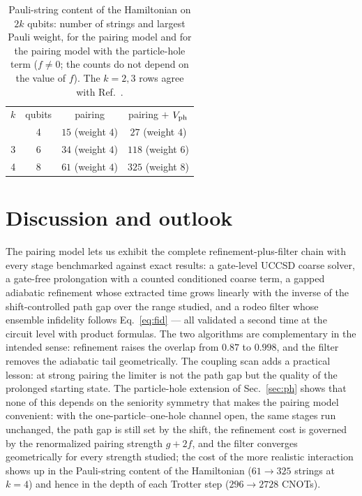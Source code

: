 \documentclass[
  aps,            %
  prc,            %
  reprint,        %
  superscriptaddress,
  floatfix,
  nofootinbib
]{revtex4-2}
\begin{document}
\begin{table}[t]
\caption{\label{tab:pauli}Pauli-string content of the Hamiltonian on $2k$
qubits: number of strings and largest Pauli weight, for the pairing model and
for the pairing model with the particle-hole term ($f\neq0$; the counts do not
depend on the value of $f$).  The $k=2,3$ rows agree with Ref.~\cite{MHJbook}.}
\footnotesize
\begin{ruledtabular}
\begin{tabular}{cccc}
$k$ & qubits & pairing & pairing $+$ $V_{\rm ph}$\\
\colrule
2 & 4 & $15$ (weight $4$) & $27$ (weight $4$)\\
3 & 6 & $34$ (weight $4$) & $118$ (weight $6$)\\
4 & 8 & $61$ (weight $4$) & $325$ (weight $8$)\\
\end{tabular}
\end{ruledtabular}
\end{table}

\section{Discussion and outlook}
\label{sec:discussion}
The pairing model lets us exhibit the complete refinement-plus-filter chain
with every stage benchmarked against exact results: a gate-level UCCSD coarse
solver, a gate-free prolongation with a counted conditioned coarse term, a
gapped adiabatic refinement whose extracted time grows linearly with the
inverse of the shift-controlled path gap over the range studied, and a rodeo
filter whose ensemble infidelity follows Eq.~\eqref{eq:fid} --- all validated
a second time at the circuit level with product formulas.  The two algorithms
are complementary in the intended sense: refinement raises the overlap from
$0.87$ to $0.998$, and the filter removes the adiabatic tail geometrically.
The coupling scan adds a practical lesson: at strong pairing the limiter is
not the path gap but the quality of the prolonged starting state.  The
particle-hole extension of Sec.~\ref{sec:ph} shows that none of this depends
on the seniority symmetry that makes the pairing model convenient: with the
one-particle--one-hole channel open, the same stages run unchanged, the path
gap is still set by the shift, the refinement cost is governed by the
renormalized pairing strength $g+2f$, and the filter converges geometrically
for every strength studied; the cost of the more realistic interaction shows
up in the Pauli-string content of the Hamiltonian ($61\to325$ strings at $k=4$)
and hence in the depth of each Trotter step ($296\to2728$ CNOTs).
\end{document}
